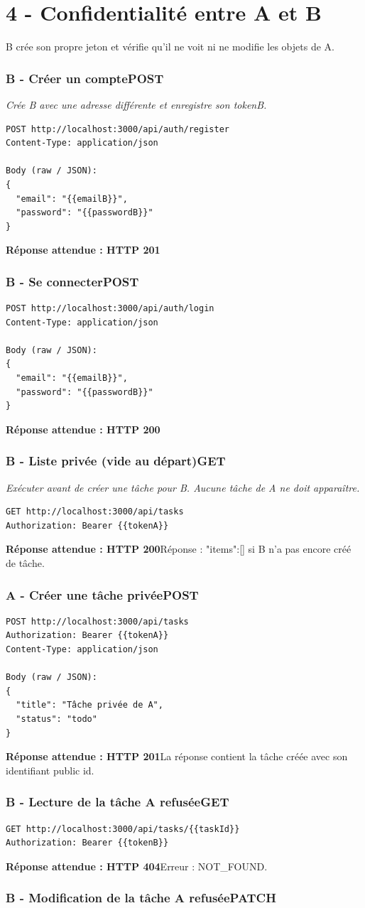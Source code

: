 \documentclass[10pt,a4paper]{article}
\newcommand{\expected}[2]{\par\smallskip\noindent\colorbox{forest!9}{\parbox{\dimexpr\linewidth-2\fboxsep}{\textcolor{forest}{\textbf{Réponse attendue : HTTP #1}}\hspace{0.4em}#2}}\par\medskip}
\newcommand{\reqheading}[3]{\subsubsection*{\textcolor{forest}{#1}\hfill\textcolor{ink}{\small #2}}\textit{#3}\par}
\begin{document}
\section{4 - Confidentialité entre A et B}
B crée son propre jeton et vérifie qu'il ne voit ni ne modifie les objets de A.
\reqheading{B - Créer un compte}{POST}{Crée B avec une adresse différente et enregistre son tokenB.}
\begin{lstlisting}[style=requestcode]
POST http://localhost:3000/api/auth/register
Content-Type: application/json

Body (raw / JSON):
{
  "email": "{{emailB}}",
  "password": "{{passwordB}}"
}
\end{lstlisting}
\expected{201}{}
\vspace{0.25em}
\reqheading{B - Se connecter}{POST}{}
\begin{lstlisting}[style=requestcode]
POST http://localhost:3000/api/auth/login
Content-Type: application/json

Body (raw / JSON):
{
  "email": "{{emailB}}",
  "password": "{{passwordB}}"
}
\end{lstlisting}
\expected{200}{}
\vspace{0.25em}
\reqheading{B - Liste privée (vide au départ)}{GET}{Exécuter avant de créer une tâche pour B. Aucune tâche de A ne doit apparaître.}
\begin{lstlisting}[style=requestcode]
GET http://localhost:3000/api/tasks
Authorization: Bearer {{tokenA}}
\end{lstlisting}
\expected{200}{Réponse : {"items":[]} si B n'a pas encore créé de tâche.}
\vspace{0.25em}
\reqheading{A - Créer une tâche privée}{POST}{}
\begin{lstlisting}[style=requestcode]
POST http://localhost:3000/api/tasks
Authorization: Bearer {{tokenA}}
Content-Type: application/json

Body (raw / JSON):
{
  "title": "Tâche privée de A",
  "status": "todo"
}
\end{lstlisting}
\expected{201}{La réponse contient la tâche créée avec son identifiant public id.}
\vspace{0.25em}
\reqheading{B - Lecture de la tâche A refusée}{GET}{}
\begin{lstlisting}[style=requestcode]
GET http://localhost:3000/api/tasks/{{taskId}}
Authorization: Bearer {{tokenB}}
\end{lstlisting}
\expected{404}{Erreur : NOT\_FOUND.}
\vspace{0.25em}
\reqheading{B - Modification de la tâche A refusée}{PATCH}{}
\end{document}
